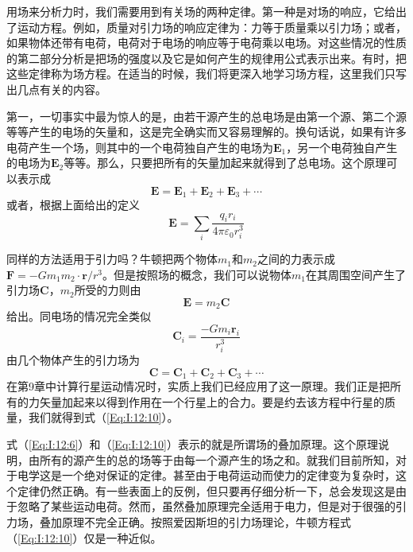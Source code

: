 用场来分析力时，我们需要用到有关场的两种定律。第一种是对场的响应，它给出了运动方程。例如，质量对引力场的响应定律为：力等于质量乘以引力场；或者，如果物体还带有电荷，电荷对于电场的响应等于电荷乘以电场。对这些情况的性质的第二部分分析是把场的强度以及它是如何产生的规律用公式表示出来。有时，把这些定律称为场方程。在适当的时候，我们将更深入地学习场方程，这里我们只写出几点有关的内容。

第一，一切事实中最为惊人的是，由若干源产生的总电场是由第一个源、第二个源等等产生的电场的矢量和，这是完全确实而又容易理解的。换句话说，如果有许多电荷产生一个场，则其中的一个电荷独自产生的电场为$\boldsymbol{E}_1$，另一个电荷独自产生的电场为$\boldsymbol{E}_2$等等。那么，只要把所有的矢量加起来就得到了总电场。这个原理可以表示成
\begin{equation}
    \label{Eq:I:12:6}
    \boldsymbol{E}=\boldsymbol{E}_1+\boldsymbol{E}_2+\boldsymbol{E}_3+\cdots
\end{equation}
或者，根据上面给出的定义
\begin{equation}
    \label{Eq:I:12:7}
    \boldsymbol{E}=\sum_{i} \frac{q_ir_i}{4\pi \varepsilon_0 r^3_i}
\end{equation}

同样的方法适用于引力吗？牛顿把两个物体$m_1$和$m_2$之间的力表示成$\boldsymbol{F}=-Gm_1m_2 \cdot \boldsymbol{r}/r^3$。但是按照场的概念，我们可以说物体$m_1$在其周围空间产生了引力场$\boldsymbol{C}$，$m_2$所受的力则由
\begin{equation}
    \label{Eq:I:12:8}
    \boldsymbol{E}=m_2\boldsymbol{C}
\end{equation}
给出。同电场的情况完全类似
\begin{equation}
    \label{Eq:I:12:9}
    \boldsymbol{C}_i=\frac{-Gm_i\boldsymbol{r}_i}{r^3_i}
\end{equation}
由几个物体产生的引力场为
\begin{equation}
    \label{Eq:I:12:10}
    \boldsymbol{C}=\boldsymbol{C}_1+\boldsymbol{C}_2+\boldsymbol{C}_3+\cdots
\end{equation}
在第9章中计算行星运动情况时，实质上我们已经应用了这一原理。我们正是把所有的力矢量加起来以得到作用在一个行星上的合力。要是约去该方程中行星的质量，我们就得到式（\ref{Eq:I:12:10}）。

式（\ref{Eq:I:12:6}）和（\ref{Eq:I:12:10}）表示的就是所谓场的叠加原理。这个原理说明，由所有的源产生的总的场等于由每一个源产生的场之和。就我们目前所知，对于电学这是一个绝对保证的定律。甚至由于电荷运动而使力的定律变为复杂时，这个定律仍然正确。有一些表面上的反例，但只要再仔细分析一下，总会发现这是由于忽略了某些运动电荷。然而，虽然叠加原理完全适用于电力，但是对于很强的引力场，叠加原理不完全正确。按照爱因斯坦的引力场理论，牛顿方程式（\ref{Eq:I:12:10}）仅是一种近似。

